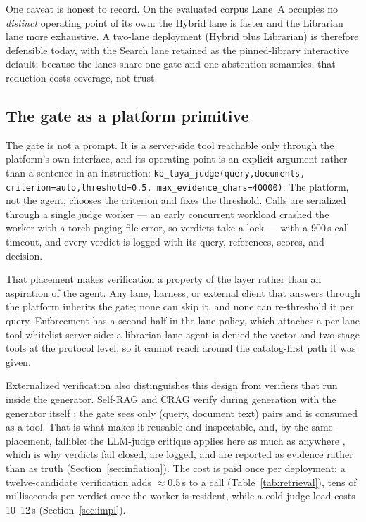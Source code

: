 One caveat is honest to record. On the evaluated corpus Lane~A occupies no
\emph{distinct} operating point of its own: the Hybrid lane is faster and the
Librarian lane more exhaustive. A two-lane deployment (Hybrid plus Librarian) is
therefore defensible today, with the Search lane retained as the pinned-library
interactive default; because the lanes share one gate and one abstention
semantics, that reduction costs coverage, not trust.

\subsection{The gate as a platform primitive}

The gate is not a prompt. It is a server-side tool reachable only through the
platform's own interface, and its operating point is an explicit argument rather
than a sentence in an instruction:
\texttt{kb\_laya\_judge(query,\allowbreak documents,\allowbreak
criterion=auto,\allowbreak threshold=0.5,\allowbreak
max\_evidence\_chars=40000)}. The platform, not the agent, chooses the criterion
and fixes the threshold. Calls are serialized through a single judge worker
--- an early concurrent workload crashed the worker with a torch paging-file
error, so verdicts take a lock --- with a 900\,s call timeout, and every verdict
is logged with its query, references, scores, and decision.

That placement makes verification a property of the layer rather than an
aspiration of the agent. Any lane, harness, or external client that answers
through the platform inherits the gate; none can skip it, and none can
re-threshold it per query. Enforcement has a second half in the lane policy,
which attaches a per-lane tool whitelist server-side: a librarian-lane agent is
denied the vector and two-stage tools at the protocol level, so it cannot reach
around the catalog-first path it was given.

Externalized verification also distinguishes this design from verifiers that run
inside the generator. Self-RAG and CRAG verify during generation with the
generator itself \cite{selfrag,crag}; the gate sees only (query, document text)
pairs and is consumed as a tool. That is what makes it reusable and inspectable,
and, by the same placement, fallible: the LLM-judge critique applies here as much
as anywhere \cite{zheng-llmjudge}, which is why verdicts fail closed, are logged,
and are reported as evidence rather than as truth (Section~\ref{sec:inflation}).
The cost is paid once per deployment: a twelve-candidate verification adds
$\approx$0.5\,s to a call (Table~\ref{tab:retrieval}), tens of milliseconds per
verdict once the worker is resident, while a cold judge load costs 10--12\,s
(Section~\ref{sec:impl}).

